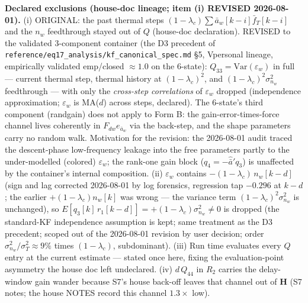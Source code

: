 \documentclass[11pt,a4paper,fontset=none]{ctexart}
\begin{document}
\textbf{Declared exclusions (house-doc lineage; item (i) REVISED
2026-08-01).}
(i) ORIGINAL: the past thermal steps
$(1-\lambda_c)\sum \bar{a}_w[k-i]\bar{f}_T[k-i]$ and the $n_w$
feedthrough stayed out of $Q$ (house-doc declaration).  REVISED to the
validated 3-component container (the D3 precedent of
\texttt{reference/eq17\_analysis/kf\_canonical\_spec.md} \S5, Vpersonal
lineage, empirically validated emp/closed $\approx 1.0$ on the 6-state):
$Q_{33} = \mathrm{Var}(\varepsilon_w)$ in full --- current thermal step,
thermal history at $(1-\lambda_c)^2$, and $(1-\lambda_c)^2\sigma^2_{n_w}$
feedthrough --- with only the \emph{cross-step correlations} of
$\varepsilon_w$ dropped (independence approximation; $\varepsilon_w$ is
MA($d$) across steps, declared).  The 6-state's third component
(randgain) does not apply to Form B: the gain-error-times-force channel
lives coherently in $F_{dw}e_{\bar{a}_w}$ via the back-step, and the
shape parameters carry no random walk.  Motivation for the revision: the
2026-08-01 audit traced the descent-phase low-frequency leakage into the
free parameters partly to the under-modelled (colored) $\varepsilon_w$;
the rank-one gain block ($q_4 = -\hat{\bar{a}}' q_3$) is unaffected by
the container's internal composition.
(ii) $\varepsilon_w$ contains $-(1-\lambda_c)\,n_w[k-d]$ (sign and lag
corrected 2026-08-01 by log forensics, regression tap $-0.296$ at
$k{-}d$; the earlier $+(1-\lambda_c)n_w[k]$ was wrong --- the variance
term $(1-\lambda_c)^2\sigma^2_{n_w}$ is unchanged), so
$E[q_3[k]\,r_1[k-d]] = +(1-\lambda_c)\sigma^2_{n_w} \neq 0$ is dropped
(the standard-KF independence assumption is kept; same treatment as the
D3 precedent; scoped out of the 2026-08-01 revision by user decision;
order $\sigma^2_{n_w}/\sigma^2_T \approx 9\%$ times $(1-\lambda_c)$,
subdominant).
(iii) Run time evaluates every $Q$ entry at the current estimate ---
stated once here, fixing the evaluation-point asymmetry the house doc
left undeclared.
(iv) $d\,Q_{44}$ in $R_2$ carries the delay-window gain wander because
S7's house back-off leaves that channel out of $\mathbf{H}$ (S7 notes;
the house NOTES record this channel $1.3\times$ low).
\end{document}
